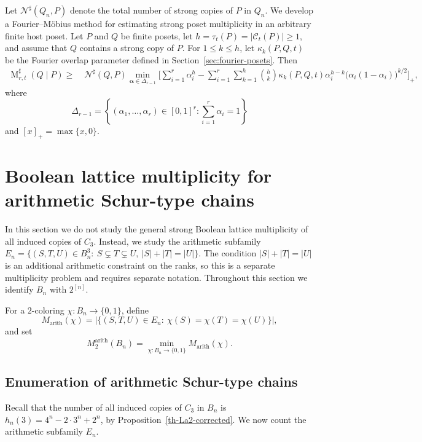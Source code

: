\documentclass[twoside,12pt]{article}
\begin{document}
Let $\mathcal N^{\sharp}(Q_n,P)$ denote the total number of strong copies of $P$ in $Q_n$. 
We develop a Fourier--M\"obius method for
estimating strong poset multiplicity in an arbitrary finite host poset. Let
$P$ and $Q$ be finite posets, let
$h=\tau_t(P)=|\mathcal C_t(P)|\geq1$,
and assume that $Q$ contains a strong copy of $P$. For
$1\leq k\leq h$, let $\kappa_k(P,Q,t)$ be the Fourier overlap parameter
defined in Section~\ref{sec:fourier-posets}. Then
\begin{equation*}\label{eq:intro-fourier-multiplicity-bound}
\begin{aligned}
\operatorname M_{r,t}^{\sharp}(Q\mid P)
\geq\;&
\mathcal N^{\sharp}(Q,P)
\min_{\boldsymbol\alpha\in\Delta_{r-1}}
\Bigg[
\sum_{i=1}^r\alpha_i^h-
\sum_{i=1}^r\sum_{k=1}^h
\binom hk\kappa_k(P,Q,t)
\alpha_i^{h-k}
\bigl(\alpha_i(1-\alpha_i)\bigr)^{k/2}
\Bigg]_+,
\end{aligned}
\end{equation*}
where
\[
\Delta_{r-1}
=
\left\{
(\alpha_1,\ldots,\alpha_r)\in[0,1]^r:
\sum_{i=1}^r\alpha_i=1
\right\}
\]
and $[x]_+=\max\{x,0\}$.

\section{Boolean lattice multiplicity for arithmetic Schur-type chains}\label{sec_2}

In this section we do not study the general strong Boolean lattice multiplicity of all induced copies of $C_3$. Instead, we study the arithmetic subfamily
 $E_n=\{(S,T,U)\in B_n^3:\ S\subsetneq T\subsetneq U,\ |S|+|T|=|U|\}$.
The condition $|S|+|T|=|U|$ is an additional arithmetic constraint on the ranks, so this is a separate multiplicity problem and requires separate notation. Throughout this section we identify $B_n$ with $2^{[n]}$.

For a $2$-coloring $\chi:B_n\to\{0,1\}$, define
\[
 M_{\mathrm{arith}}(\chi)=|\{(S,T,U)\in E_n:\ \chi(S)=\chi(T)=\chi(U)\}|,
\]
and set
\[
 M^{\mathrm{arith}}_2(B_n)=\min_{\chi:B_n\to\{0,1\}}M_{\mathrm{arith}}(\chi).
\]



\subsection{Enumeration of arithmetic Schur-type chains}

Recall that the number of all induced copies of $C_3$ in $B_n$ is $h_n(3)=4^n-2\cdot3^n+2^n$, by Proposition~\ref{th-La2-corrected}. We now count the arithmetic subfamily $E_n$.
\end{document}
